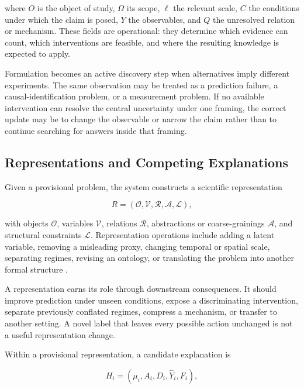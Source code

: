 \documentclass[11pt, a4paper, copyright]{google}
\begin{document}
where $O$ is the object of study, $\Omega$ its scope, $\ell$ the relevant scale, $C$ the conditions under which the claim is posed, $Y$ the observables, and $Q$ the unresolved relation or mechanism. These fields are operational: they determine which evidence can count, which interventions are feasible, and where the resulting knowledge is expected to apply.

Formulation becomes an active discovery step when alternatives imply different experiments. The same observation may be treated as a prediction failure, a causal-identification problem, or a measurement problem. If no available intervention can resolve the central uncertainty under one framing, the correct update may be to change the observable or narrow the claim rather than to continue searching for answers inside that framing.

\subsection{Representations and Competing Explanations}
\label{subsec:scientific-representations}

Given a provisional problem, the system constructs a scientific representation

\begin{equation}
R=(\mathcal{O},\mathcal{V},\mathcal{R},\mathcal{A},\mathcal{L}),
\label{eq:scientific-representation}
\end{equation}

with objects $\mathcal{O}$, variables $\mathcal{V}$, relations $\mathcal{R}$, abstractions or coarse-grainings $\mathcal{A}$, and structural constraints $\mathcal{L}$. Representation operations include adding a latent variable, removing a misleading proxy, changing temporal or spatial scale, separating regimes, revising an ontology, or translating the problem into another formal structure \citep{brunton2016sindy,udrescu2020aifeynman,scholkopf2021causalrep}.

A representation earns its role through downstream consequences. It should improve prediction under unseen conditions, expose a discriminating intervention, separate previously conflated regimes, compress a mechanism, or transfer to another setting. A novel label that leaves every possible action unchanged is not a useful representation change.

Within a provisional representation, a candidate explanation is

\begin{equation}
H_i=(\mu_i,A_i,D_i,\widehat{Y}_i,F_i),
\label{eq:scientific-hypothesis}
\end{equation}
\end{document}

